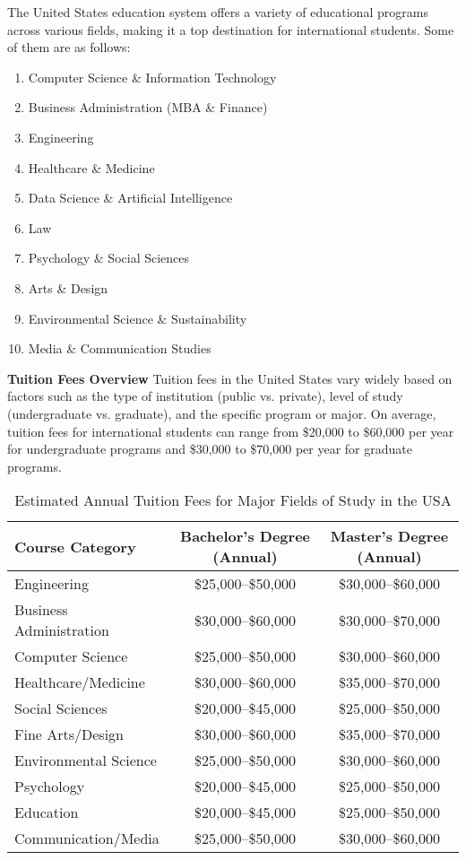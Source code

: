 The United States education system offers a variety of educational programs across various fields, making it a top destination for international students. Some of them are as follows:

\begin{enumerate}
    \item Computer Science \& Information Technology
    \item Business Administration (MBA \& Finance)
    \item Engineering
    \item Healthcare \& Medicine
    \item Data Science \& Artificial Intelligence
    \item Law
    \item Psychology \& Social Sciences
    \item Arts \& Design
    \item Environmental Science \& Sustainability
    \item Media \& Communication Studies
\end{enumerate}

\textbf{Tuition Fees Overview}
Tuition fees in the United States vary widely based on factors such as the type of institution (public vs. private), level of study (undergraduate vs. graduate), and the specific program or major. On average, tuition fees for international students can range from \$20,000 to \$60,000 per year for undergraduate programs and \$30,000 to \$70,000 per year for graduate programs.
\begin{table}[h!]
\centering
\begin{tabular}{|l|c|c|}
\hline
\textbf{Course Category} & \textbf{Bachelor's Degree (Annual)} & \textbf{Master's Degree (Annual)} \\
\hline
Engineering & \$25,000--\$50,000 & \$30,000--\$60,000 \\
Business Administration & \$30,000--\$60,000 & \$30,000--\$70,000 \\
Computer Science & \$25,000--\$50,000 & \$30,000--\$60,000 \\
Healthcare/Medicine & \$30,000--\$60,000 & \$35,000--\$70,000 \\
Social Sciences & \$20,000--\$45,000 & \$25,000--\$50,000 \\
Fine Arts/Design & \$30,000--\$60,000 & \$35,000--\$70,000 \\
Environmental Science & \$25,000--\$50,000 & \$30,000--\$60,000 \\
Psychology & \$20,000--\$45,000 & \$25,000--\$50,000 \\
Education & \$20,000--\$45,000 & \$25,000--\$50,000 \\
Communication/Media & \$25,000--\$50,000 & \$30,000--\$60,000 \\
\hline
\end{tabular}
\caption{Estimated Annual Tuition Fees for Major Fields of Study in the USA}
\end{table}

